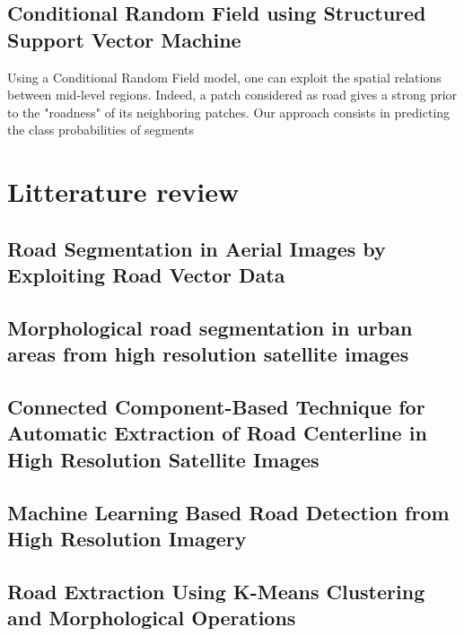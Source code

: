 \documentclass[10pt,conference,compsocconf]{IEEEtran}
\begin{document}
\subsection{Conditional Random Field using Structured Support Vector Machine}
\label{sec:orgheadline4}
Using a Conditional Random Field model, one can exploit the spatial relations between mid-level regions. Indeed, a patch considered as road gives a strong prior to the "roadness" of its neighboring patches. Our approach consists in predicting the class probabilities of segments

\section{Litterature review}
\label{sec:orgheadline11}
\subsection{Road Segmentation in Aerial Images by Exploiting Road Vector Data \cite{6602035}}
\label{sec:orgheadline6}
\subsection{Morphological road segmentation in urban areas from high resolution satellite images \cite{gaetano:inria-00618222}}
\label{sec:orgheadline7}
\subsection{Connected Component-Based Technique for Automatic Extraction of Road Centerline in High Resolution Satellite Images \cite{sujatha15_connec_compon_based_techn_autom}}
\label{sec:orgheadline8}
\subsection{Machine Learning Based Road Detection from High Resolution Imagery}
\label{sec:orgheadline9}
\subsection{Road Extraction Using K-Means Clustering and Morphological Operations \cite{maurya2011road}}
\label{sec:orgheadline10}



\printbibliography
\end{document}
